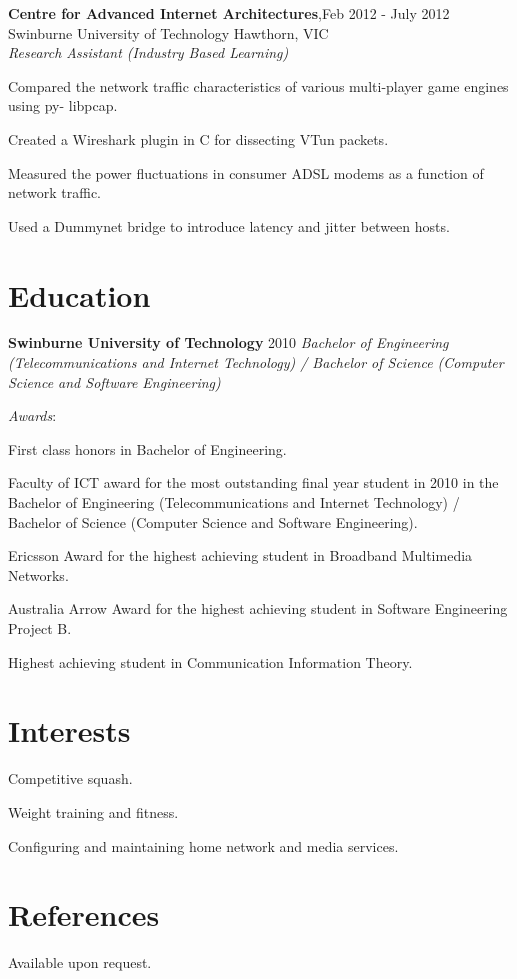 \documentclass[line,margin]{res}
\begin{document}
\begin{resume}
        \textbf{Centre for Advanced Internet Architectures},\hfill Feb 2012 - July 2012 \\
        Swinburne University of Technology Hawthorn, VIC \\
        \textit{Research Assistant (Industry Based Learning)}
        \begin{list}{}{\leftmargin=1em \itemsep=-2pt}
            \item{Compared the network traffic characteristics of various multi-player game engines using py-
                libpcap.}
            \item{Created a Wireshark plugin in C for dissecting VTun packets.}
            \item{Measured the power fluctuations in consumer ADSL modems as a function of network traffic.}
            \item{Used a Dummynet bridge to introduce latency and jitter between hosts.}
        \end{list}

        \section{Education} \textbf{Swinburne University of Technology} \hfill 2010
        \textit{Bachelor of Engineering (Telecommunications and Internet Technology) / Bachelor of Science (Computer Science and Software Engineering)}

        \textit{Awards}:
        \begin{list}{}{\leftmargin=1em \itemsep=-2pt}
            \item{First class honors in Bachelor of Engineering.}
            \item{Faculty of ICT award for the most outstanding final year student in 2010 in the Bachelor of Engineering (Telecommunications and Internet Technology) / Bachelor of Science (Computer Science and Software Engineering).}
            \item{Ericsson Award for the highest achieving student in Broadband Multimedia Networks.}
            \item{Australia Arrow Award for the highest achieving student in Software Engineering Project B.}
            \item{Highest achieving student in Communication Information Theory.}
        \end{list}

        \section{Interests}
        \begin{list}{}{\leftmargin=1em \itemsep=-2pt}
            \item{Competitive squash.}
            \item{Weight training and fitness.}
            \item{Configuring and maintaining home network and media services.}
        \end{list}

        \section{References}
        Available upon request.
    \end{resume}
\end{document}
